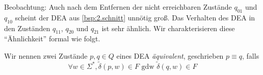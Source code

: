 
%         
%
%

\medskip

Beobachtung: Auch nach dem Entfernen der nicht erreichbaren Zustände $q_{01}$ und $q_{10}$ scheint der DEA aus \autoref{bsp:2.schnitt} unnötig groß. Das Verhalten des DEA in den Zuständen $q_{11}$, $q_{20}$ und $q_{21}$ ist sehr ähnlich. 
Wir charakterisieren diese ``Ähnlichkeit'' formal wie folgt.

\begin{Def}[name={[Äquivalenz von \acs*{DEA}-Zuständen]}] %
  Wir nennen zwei Zustände $p,q\in Q$ eines \ac{DEA} \emph{äquivalent}, geschrieben $p\equiv q$, falls
  \begin{displaymath}
  \forall w\in\Sigma^*, \tilde\delta(p,w)\in F \text{ gdw } \tilde\delta(q,w)\in F
\end{displaymath}
\end{Def}

